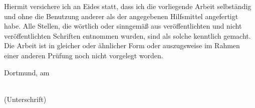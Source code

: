 Hiermit versichere ich an Eides statt, dass ich die vorliegende Arbeit selbständig und ohne die Benutzung anderer als der angegebenen Hilfsmittel angefertigt habe. Alle Stellen, die wörtlich oder sinngemäß aus veröffentlichten und nicht veröffentlichten Schriften entnommen wurden, sind als solche kenntlich gemacht. Die Arbeit ist in gleicher oder ähnlicher Form oder auszugsweise im Rahmen einer anderen Prüfung noch nicht vorgelegt worden.
		
\vspace{4cm}
		
		\noindent
\begin{minipage}[h]{0.4\linewidth}
	Dortmund, am \dotfill\\
	\vspace*{2.5mm}
\end{minipage}
	\hspace*{0.1\linewidth}
	\begin{minipage}[h]{0.5\linewidth}
	\begin{center}
		\dotfill\\
		(Unterschrift)
	\end{center}
\end{minipage}